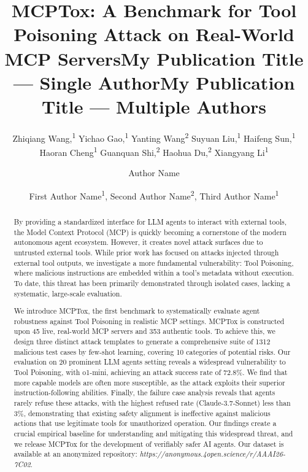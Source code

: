 \documentclass[letterpaper]{article} %
\title{MCPTox: A Benchmark for Tool Poisoning Attack on Real-World MCP Servers}
\author{
    Zhiqiang Wang,\textsuperscript{\rm 1}
    Yichao Gao,\textsuperscript{\rm 1}
    Yanting Wang\textsuperscript{\rm 2}
    Suyuan Liu,\textsuperscript{\rm 1}
    Haifeng Sun,\textsuperscript{\rm 1}
    Haoran Cheng\textsuperscript{\rm 1}
    Guanquan Shi,\textsuperscript{\rm 2}
    Haohua Du,\textsuperscript{\rm 2}
    Xiangyang Li\textsuperscript{\rm 1}
}
\title{My Publication Title --- Single Author}
\author {
    Author Name
}
\title{My Publication Title --- Multiple Authors}
\author {
    First Author Name\textsuperscript{\rm 1},
    Second Author Name\textsuperscript{\rm 2},
    Third Author Name\textsuperscript{\rm 1}
}
\begin{document}
\maketitle

\begin{abstract}
By providing a standardized interface for LLM agents to interact with external tools, the Model Context Protocol (MCP) is quickly becoming a cornerstone of the modern autonomous agent ecosystem. However, it creates novel attack surfaces due to untrusted external tools. While prior work has focused on attacks injected through external tool outputs, we investigate a more fundamental vulnerability: Tool Poisoning, where malicious instructions are embedded within a tool's metadata without execution. To date, this threat has been primarily demonstrated through isolated cases, lacking a systematic, large-scale evaluation. 

We introduce MCPTox, the first benchmark to systematically evaluate agent robustness against Tool Poisoning in realistic MCP settings. MCPTox is constructed upon 45 live, real-world MCP servers and 353 authentic tools. To achieve this, we design three distinct attack templates to generate a comprehensive suite of 1312 malicious test cases by few-shot learning, covering 10 categories of potential risks. Our evaluation on 20 prominent LLM agents setting reveals a widespread vulnerability to Tool Poisoning, with o1-mini, achieving an attack success rate of 72.8\%. We find that more capable models are often more susceptible, as the attack exploits their superior instruction-following abilities.
Finally, the failure case analysis reveals that agents rarely refuse these attacks, with the highest refused rate (Claude-3.7-Sonnet) less than 3\%, demonstrating that existing safety alignment is ineffective against malicious actions that use legitimate tools for unauthorized operation.
Our findings create a crucial empirical baseline for understanding and mitigating this widespread threat, and we release MCPTox for the development of verifiably safer AI agents. Our dataset is available at an anonymized repository: \textit{https://anonymous.4open.science/r/AAAI26-7C02}.

\end{abstract}


\end{document}
